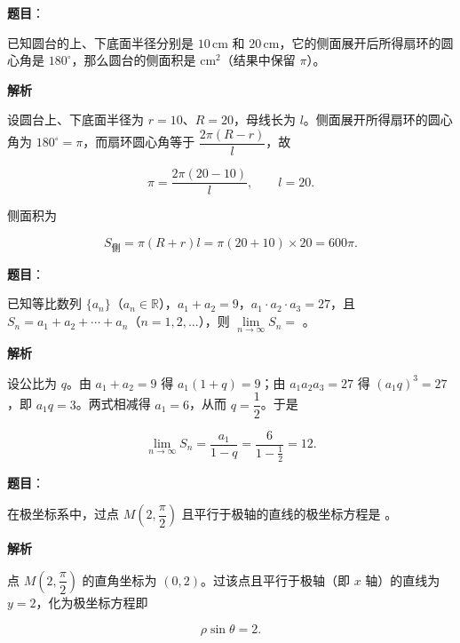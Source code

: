 \begin{answer}

\textbf{题目}：

已知圆台的上、下底面半径分别是 $10\,\mathrm{cm}$ 和 $20\,\mathrm{cm}$，它的侧面展开后所得扇环的圆心角是 $180^\circ$，那么圆台的侧面积是 \gkblank{} $\mathrm{cm}^2$（结果中保留 $\pi$）。

\textbf{解析}

设圆台上、下底面半径为 $r=10$、$R=20$，母线长为 $l$。侧面展开所得扇环的圆心角为 $180^\circ=\pi$，而扇环圆心角等于 $\dfrac{2\pi(R-r)}{l}$，故

\nopagebreak[4]
\[
\pi=\frac{2\pi(20-10)}{l},\qquad l=20.
\]

侧面积为

\nopagebreak[4]
\[
S_{\text{侧}}=\pi(R+r)l=\pi(20+10)\times 20=600\pi.
\]


\end{answer}
\begin{answer}

\textbf{题目}：

已知等比数列 $\{a_n\}$（$a_n\in\mathbb{R}$），$a_1+a_2=9$，$a_1\cdot a_2\cdot a_3=27$，且 $S_n=a_1+a_2+\cdots+a_n$（$n=1,2,\ldots$），则 $\lim\limits_{n\to\infty}S_n=$ \gkblank{}。

\textbf{解析}

设公比为 $q$。由 $a_1+a_2=9$ 得 $a_1(1+q)=9$；由 $a_1a_2a_3=27$ 得 $(a_1q)^3=27$，即 $a_1q=3$。两式相减得 $a_1=6$，从而 $q=\dfrac12$。于是

\nopagebreak[4]
\[
\lim_{n\to\infty}S_n=\frac{a_1}{1-q}=\frac{6}{1-\frac12}=12.
\]


\end{answer}
\begin{answer}

\textbf{题目}：

在极坐标系中，过点 $M\left(2,\dfrac{\pi}{2}\right)$ 且平行于极轴的直线的极坐标方程是 \gkblank{}。

\textbf{解析}

点 $M\left(2,\dfrac{\pi}{2}\right)$ 的直角坐标为 $(0,2)$。过该点且平行于极轴（即 $x$ 轴）的直线为 $y=2$，化为极坐标方程即

\nopagebreak[4]
\[
\rho\sin\theta=2.
\]


\end{answer}
